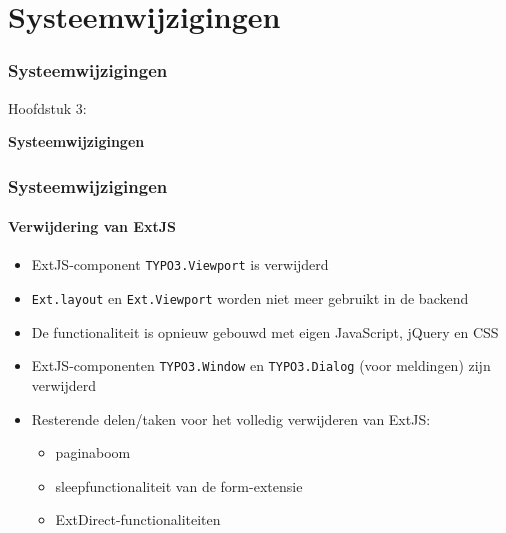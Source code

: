 %

\section{Systeemwijzigingen}
\begin{frame}[fragile]
	\frametitle{Systeemwijzigingen}

	\begin{center}\huge{Hoofdstuk 3:}\end{center}
	\begin{center}\huge{\color{typo3darkgrey}\textbf{Systeemwijzigingen}}\end{center}

\end{frame}


\begin{frame}[fragile]
	\frametitle{Systeemwijzigingen}
	\framesubtitle{Verwijdering van ExtJS}

	\begin{itemize}
		\item ExtJS-component \texttt{TYPO3.Viewport} is verwijderd
		\item \texttt{Ext.layout} en \texttt{Ext.Viewport} worden niet meer gebruikt in de backend
		\item De functionaliteit is opnieuw gebouwd met eigen JavaScript, jQuery en CSS
		\item ExtJS-componenten \texttt{TYPO3.Window} en \texttt{TYPO3.Dialog} (voor meldingen) zijn verwijderd
		\item Resterende delen/taken voor het volledig verwijderen van ExtJS:

		\begin{itemize}
			\item paginaboom
			\item sleepfunctionaliteit van de form-extensie
			\item ExtDirect-functionaliteiten
		\end{itemize}

	\end{itemize}

\end{frame}

